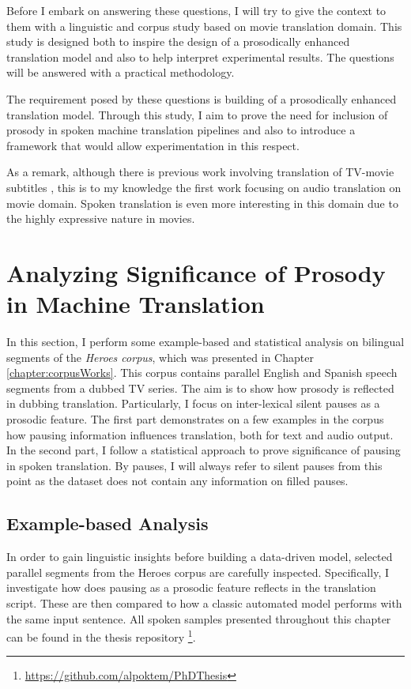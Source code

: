 Before I embark on answering these questions, I will try to give the context to them with a linguistic and corpus study based on movie translation domain. This study is designed both to inspire the design of a prosodically enhanced translation model and also to help interpret experimental results. The questions will be answered with a practical methodology. 

The requirement posed by these questions is building of a prosodically enhanced translation model. Through this study, I aim to prove the need for inclusion of prosody in spoken machine translation pipelines and also to introduce a framework that would allow experimentation in this respect. 

As a remark, although there is previous work involving translation of TV-movie subtitles \citep{zora36755, zora8817}, this is to my knowledge the first work focusing on audio translation on movie domain. Spoken translation is even more interesting in this domain due to the highly expressive nature in movies. 

\section{Analyzing Significance of Prosody in Machine Translation}
\label{transProse:analysis}
In this section, I perform some example-based and statistical analysis on bilingual segments of the \textit{Heroes corpus}, which was presented in Chapter \ref{chapter:corpusWorks}. This corpus contains parallel English and Spanish speech segments from a dubbed TV series. The aim is to show how prosody is reflected in dubbing translation. Particularly, I focus on inter-lexical silent pauses as a prosodic feature. The first part demonstrates on a few examples in the corpus how pausing information influences translation, both for text and audio output. In the second part, I follow a statistical approach to prove significance of pausing in spoken translation. By pauses, I will always refer to silent pauses from this point as the dataset does not contain any information on filled pauses. 

\subsection{Example-based Analysis}
\label{subsection:heroes_examples}
In order to gain linguistic insights before building a data-driven model, selected parallel segments from the Heroes corpus are carefully inspected. Specifically, I investigate how does pausing as a prosodic feature reflects in the translation script. These are then compared to how a classic automated model performs with the same input sentence. All spoken samples presented throughout this chapter can be found in the thesis repository \footnote{\url{https://github.com/alpoktem/PhDThesis}}.

